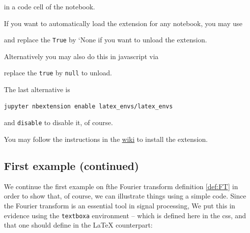 in a code cell of the notebook.

    If you want to automatically load the extension for any notebook, you
may use

\begin{Shaded}
\begin{Highlighting}[]
  
\NormalTok{, \{}\NormalTok{: \{}\NormalTok{: }\NormalTok{\}\})}
\end{Highlighting}
\end{Shaded}

    and replace the \texttt{True} by `None if you want to unload the
extension.

Alternatively you may also do this in javascript via

\begin{Shaded}
\end{Shaded}

    replace the \texttt{true} by \texttt{null} to unload.

The last alternative is

\begin{verbatim}
jupyter nbextension enable latex_envs/latex_envs
\end{verbatim}

    and \texttt{disable} to disable it, of course.

    You may follow the instructions in the
\href{https://github.com/ipython-contrib/IPython-notebook-extensions/wiki}{wiki}
to install the extension.

    \subsection{First example (continued)}\label{first-example-continued}

    We continue the first example on fthe Fourier transform definition
\ref{def:FT} in order to show that, of course, we can illustrate things
using a simple code. Since the Fourier transform is an essential tool in
signal processing, We put this in evidence using the \texttt{textboxa}
environment -- which is defined here in the css, and that one should
define in the LaTeX counterpart:

